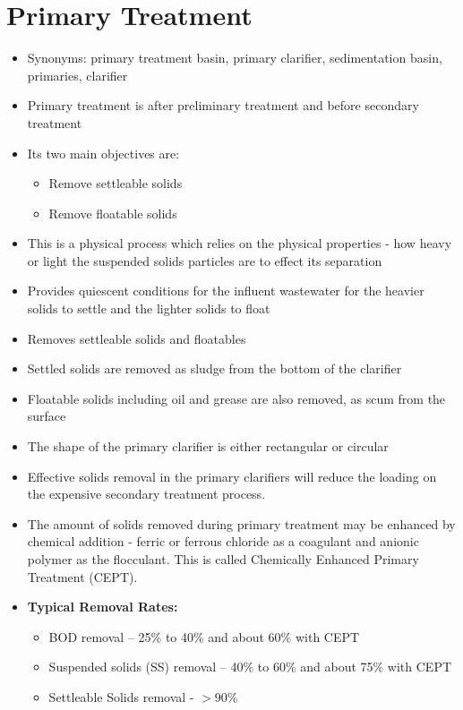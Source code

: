 
\chapter{Primary Treatment}

\begin{itemize}
\item Synonyms:  primary treatment basin, primary clarifier, sedimentation basin, primaries, clarifier

	
		\item Primary treatment is after preliminary treatment and 				before secondary treatment
		\item Its two main objectives are: 
			\begin{itemize}
				\item Remove settleable solids
				\item Remove floatable solids
			\end{itemize}
		\item This is a physical process which relies on the physical 			properties - how heavy or light the suspended solids particles 		are to effect its separation
		\item Provides quiescent conditions for the influent 					wastewater for the heavier solids to settle and the lighter 			solids to float
		\item Removes settleable solids and floatables
		\item Settled solids are removed as sludge from the bottom of 			the clarifier
		\item Floatable solids including oil and grease are also 				removed, as scum from the surface\\
		\item The shape of the primary clarifier is either rectangular 		or circular
	
		\item Effective solids removal in the primary clarifiers will 			reduce the loading on the expensive secondary treatment 				process.
		\item The amount of solids removed during primary treatment 			may be enhanced by chemical addition - ferric or ferrous 				chloride as a coagulant and anionic polymer as the flocculant.  		This is called Chemically Enhanced Primary Treatment (CEPT).
\item \textbf{Typical Removal Rates:}\\
\begin{itemize}
\item \hspace{10mm} BOD removal – 25\% to 40\% and about 60\% with CEPT
\item \hspace{10mm} Suspended solids (SS) removal – 40\% to 60\% and about 75\% with CEPT
\item \hspace{10mm} Settleable Solids removal - $>$90\%
\end{itemize}
\end{itemize}
